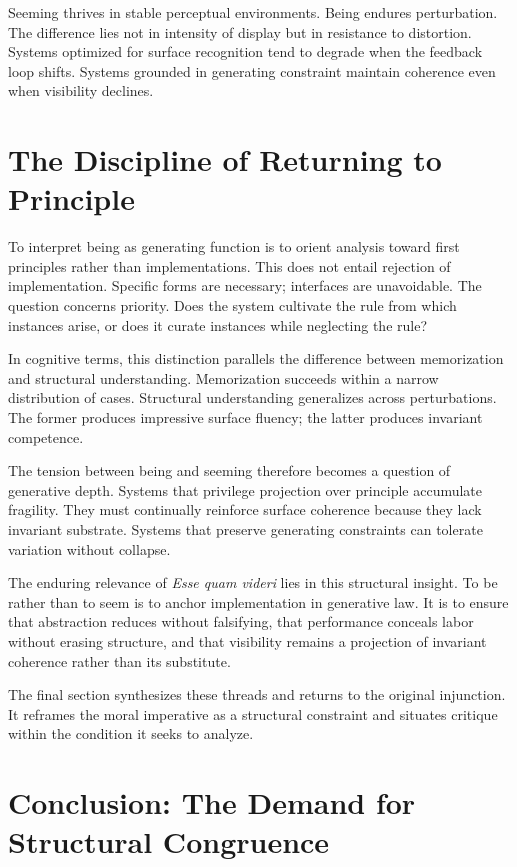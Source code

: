 \documentclass[11pt]{article}
\begin{document}
Seeming thrives in stable perceptual environments. Being endures perturbation. The difference lies not in intensity of display but in resistance to distortion. Systems optimized for surface recognition tend to degrade when the feedback loop shifts. Systems grounded in generating constraint maintain coherence even when visibility declines.

\section{The Discipline of Returning to Principle}

To interpret being as generating function is to orient analysis toward first principles rather than implementations. This does not entail rejection of implementation. Specific forms are necessary; interfaces are unavoidable. The question concerns priority. Does the system cultivate the rule from which instances arise, or does it curate instances while neglecting the rule?

In cognitive terms, this distinction parallels the difference between memorization and structural understanding. Memorization succeeds within a narrow distribution of cases. Structural understanding generalizes across perturbations. The former produces impressive surface fluency; the latter produces invariant competence.

The tension between being and seeming therefore becomes a question of generative depth. Systems that privilege projection over principle accumulate fragility. They must continually reinforce surface coherence because they lack invariant substrate. Systems that preserve generating constraints can tolerate variation without collapse.

The enduring relevance of \textit{Esse quam videri} lies in this structural insight. To be rather than to seem is to anchor implementation in generative law. It is to ensure that abstraction reduces without falsifying, that performance conceals labor without erasing structure, and that visibility remains a projection of invariant coherence rather than its substitute.

The final section synthesizes these threads and returns to the original injunction. It reframes the moral imperative as a structural constraint and situates critique within the condition it seeks to analyze.

\section{Conclusion: The Demand for Structural Congruence}
\end{document}
